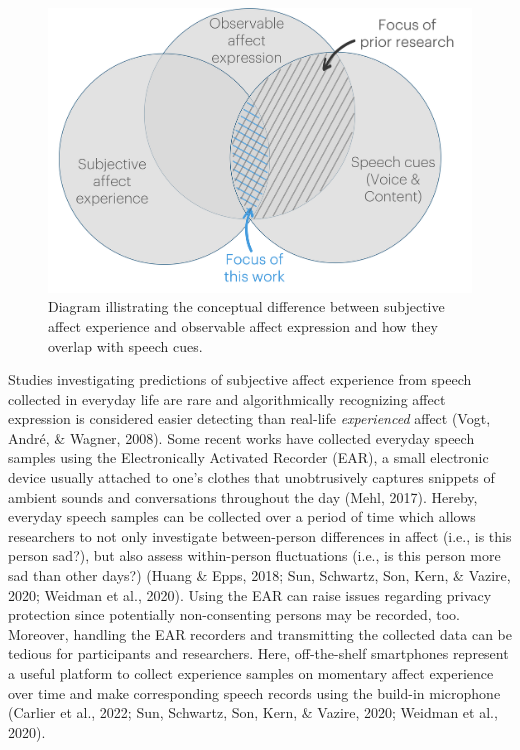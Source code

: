 \documentclass[
  english,
  man,floatsintext]{apa6}
\begin{document}
\begin{figure}

{\centering \includegraphics[width=0.75\linewidth]{../figures/experience_vs_expression} 

}

\caption[Experience versus expression]{Diagram illistrating the conceptual difference between subjective affect experience and observable affect expression and how they overlap with speech cues.}\label{fig:experiencevsexpression}
\end{figure}

Studies investigating predictions of subjective affect experience from speech collected in everyday life are rare and algorithmically recognizing affect expression is considered easier detecting than real-life \emph{experienced} affect (Vogt, André, \& Wagner, 2008). Some recent works have collected everyday speech samples using the Electronically Activated Recorder (EAR), a small electronic device usually attached to one's clothes that unobtrusively captures snippets of ambient sounds and conversations throughout the day (Mehl, 2017). Hereby, everyday speech samples can be collected over a period of time which allows researchers to not only investigate between-person differences in affect (i.e., is this person sad?), but also assess within-person fluctuations (i.e., is this person more sad than other days?) (Huang \& Epps, 2018; Sun, Schwartz, Son, Kern, \& Vazire, 2020; Weidman et al., 2020). Using the EAR can raise issues regarding privacy protection since potentially non-consenting persons may be recorded, too. Moreover, handling the EAR recorders and transmitting the collected data can be tedious for participants and researchers. Here, off-the-shelf smartphones represent a useful platform to collect experience samples on momentary affect experience over time and make corresponding speech records using the build-in microphone (Carlier et al., 2022; Sun, Schwartz, Son, Kern, \& Vazire, 2020; Weidman et al., 2020).
\end{document}
